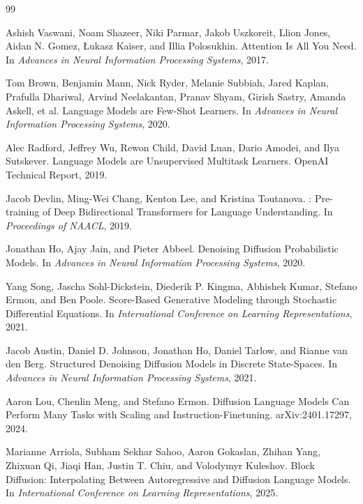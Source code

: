 \documentclass[11pt, a4paper]{article}
\theoremstyle{srn}
\theoremstyle{srnremark}
\begin{document}
\begin{thebibliography}{99}

Ashish Vaswani, Noam Shazeer, Niki Parmar, Jakob Uszkoreit, Llion Jones,
Aidan N. Gomez, {\L}ukasz Kaiser, and Illia Polosukhin.
\newblock Attention Is All You Need.
\newblock In \textit{Advances in Neural Information Processing Systems}, 2017.

Tom Brown, Benjamin Mann, Nick Ryder, Melanie Subbiah, Jared Kaplan,
Prafulla Dhariwal, Arvind Neelakantan, Pranav Shyam, Girish Sastry,
Amanda Askell, et al.
\newblock Language Models are Few-Shot Learners.
\newblock In \textit{Advances in Neural Information Processing Systems}, 2020.

Alec Radford, Jeffrey Wu, Rewon Child, David Luan, Dario Amodei, and
Ilya Sutskever.
\newblock Language Models are Unsupervised Multitask Learners.
\newblock OpenAI Technical Report, 2019.

Jacob Devlin, Ming-Wei Chang, Kenton Lee, and Kristina Toutanova.
: Pre-training of Deep Bidirectional Transformers for
Language Understanding.
\newblock In \textit{Proceedings of NAACL}, 2019.

Jonathan Ho, Ajay Jain, and Pieter Abbeel.
\newblock Denoising Diffusion Probabilistic Models.
\newblock In \textit{Advances in Neural Information Processing Systems}, 2020.

Yang Song, Jascha Sohl-Dickstein, Diederik P. Kingma, Abhishek Kumar,
Stefano Ermon, and Ben Poole.
\newblock Score-Based Generative Modeling through Stochastic Differential
Equations.
\newblock In \textit{International Conference on Learning Representations},
2021.

Jacob Austin, Daniel D. Johnson, Jonathan Ho, Daniel Tarlow, and
Rianne van den Berg.
\newblock Structured Denoising Diffusion Models in Discrete State-Spaces.
\newblock In \textit{Advances in Neural Information Processing Systems}, 2021.

Aaron Lou, Chenlin Meng, and Stefano Ermon.
\newblock Diffusion Language Models Can Perform Many Tasks with Scaling and
Instruction-Finetuning.
\newblock arXiv:2401.17297, 2024.

Marianne Arriola, Subham Sekhar Sahoo, Aaron Gokaslan, Zhihan Yang,
Zhixuan Qi, Jiaqi Han, Justin T. Chiu, and Volodymyr Kuleshov.
\newblock Block Diffusion: Interpolating Between Autoregressive and Diffusion
Language Models.
\newblock In \textit{International Conference on Learning Representations},
2025.


\end{thebibliography}
\end{document}
